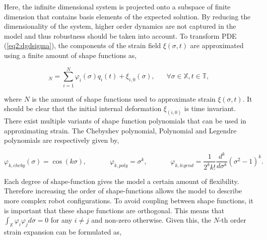 Here, the infinite dimensional system is projected onto a subspace of finite dimension that contains basis elements of the expected solution. By reducing the dimensionality of the system, higher order dynamics are not captured in the model and thus robustness should be taken into account. To transform PDE (\ref{eq2:dgdsigma}), the components of the strain field $\xi(\sigma,t)$ are approximated using a finite amount of shape functions as,

\begin{equation}
    [\xi_i(\sigma,t)]_N = \sum_{i=1}^N \varphi_i(\sigma)q_i(t) + \xi_{i,0}(\sigma), \hspace{20pt} \forall \sigma \in \mathbb{X}, t \in \mathbb{T},
    \label{eq2:strainapprox}
\end{equation}

where $N$ is the amount of shape functions used to approximate strain $\xi(\sigma,t)$. It should be clear that the initial internal deformation $\xi_{(i,0)}$ is time invariant. There exist multiple variants of shape function polynomials that can be used in approximating strain. The Chebyshev polynomial, Polynomial and Legendre polynomials are respectively given by,

\begin{equation}
    \varphi_{k,cheby}(\sigma) = \cos(k \sigma), \hspace{40pt} \varphi_{k,poly} = \sigma^k, \hspace{40pt} \varphi_{k,legend} = \frac{1}{2^k k!} \frac{d^k}{d\sigma^k}(\sigma^2-1)^k.
    \label{eq2:shapefunction}
\end{equation}


Each degree of shape-function gives the model a certain amount of flexibility. Therefore increasing the order of shape-functions allows the model to describe more complex robot configurations. To avoid coupling between shape functions,  it is important that these shape functions are orthogonal. This means that $\int_\mathbb{X} \varphi_i \varphi_j d \sigma = 0$ for any $i \neq j$ and non-zero otherwise. Given this, the $N$-th order strain expansion can be formulated as,



